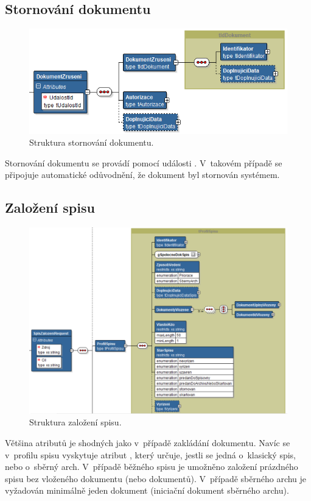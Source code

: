 \documentclass[
  master,
  field=ainfp,
  biblatex,
  language=czech,
  glossaries,
  theorems=false,
  index
]{kidiplom}
\begin{document}
\subsection{Stornování dokumentu}   
\begin{figure}[h]
  \centerline{\includegraphics[width=0.9\linewidth]{./images/UdalostDokumentStorno.png}} 
  \caption{Struktura stornování dokumentu.} 
\end{figure}  
Stornování dokumentu se provádí pomocí události . V~takovém případě se připojuje automatické odůvodnění, že dokument byl stornován systémem. 


\subsection{Založení spisu}
\begin{figure}[h]
  \centerline{\includegraphics[width=0.9\linewidth]{./images/SpisZalozeni.png}} 
  \caption{Struktura založení spisu.} 
\end{figure} 

Většina atributů je shodných jako v~případě zakládání dokumentu. Navíc se v~profilu spisu vyskytuje atribut , který určuje, jestli se jedná o~klasický spis, nebo o~sběrný arch. V~případě běžného spisu je umožněno založení prázdného spisu bez vloženého dokumentu (nebo dokumentů). V~případě sběrného archu je vyžadován minimálně jeden dokument (iniciační dokument sběrného archu).
\end{document}
